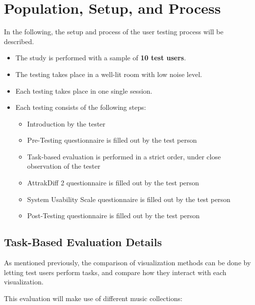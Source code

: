 \section{Population, Setup, and Process}

In the following, the setup and process of the user testing process will be described.

\begin{itemize}
  \item The study is performed with a sample of \textbf{10 test users}. 
  \item The testing takes place in a well-lit room with low noise level.
  \item Each testing takes place in one single session.
  \item Each testing consists of the following steps:
	\begin{itemize}
		\item Introduction by the tester
		\item Pre-Testing questionnaire is filled out by the test person
		\item Task-based evaluation is performed in a strict order, under close observation of the tester
		\item AttrakDiff 2 questionnaire is filled out by the test person	
		\item System Usability Scale questionnaire is filled out by the test person	
		\item Post-Testing questionnaire is filled out by the test person
	\end{itemize}
\end{itemize}

\subsection{Task-Based Evaluation Details}

As mentioned previously, the comparison of visualization methods can be done by letting test users perform tasks, and compare how they interact with each visualization. 

This evaluation will make use of different music collections:


